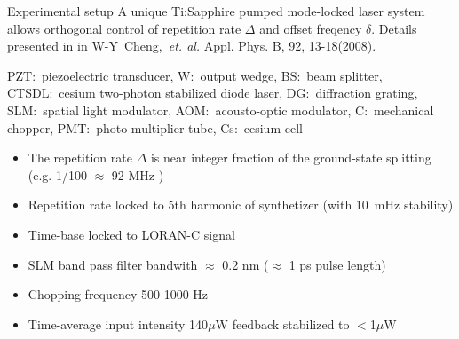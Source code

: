 \begin{block}{Experimental setup}
  A unique Ti:Sapphire pumped mode-locked laser system allows orthogonal control of repetition rate $\Delta$ and offset freqency $\delta$. Details presented in in W-Y~Cheng,~\emph{et. al.} Appl. Phys. B, 92, 13-18(2008).
  \begin{figure}
    \begin{center}
      \setlength\fboxsep{0pt}
      \setlength\fboxrule{0.5pt}
    \end{center}
    \label{Schematic of the experimental setup}
  \end{figure}
   PZT:~piezoelectric transducer, W:~output wedge, BS:~beam splitter, CTSDL:~cesium two-photon stabilized diode laser, DG:~diffraction grating, SLM:~spatial light modulator, AOM:~acousto-optic modulator, C:~mechanical chopper, PMT:~photo-multiplier tube, Cs:~cesium cell
  \begin{itemize}
  \item The repetition rate $\Delta$ is near integer fraction of the ground-state splitting (e.g. 1/100 $\approx$ 92 MHz )
  \item Repetition rate locked to 5th harmonic of synthetizer (with 10~mHz stability)
  \item Time-base locked to LORAN-C signal
  \item SLM band pass filter bandwith $\approx$ 0.2 nm ($\approx$ 1 ps pulse length)
  \item Chopping frequency 500-1000 Hz
  \item Time-average input intensity 140$\mu$W feedback stabilized to $<$1$\mu$W
  \end{itemize}
\end{block}
